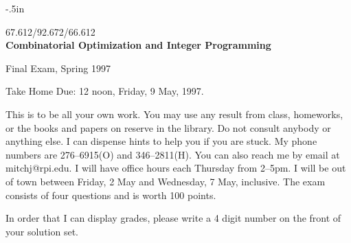 

\oddsidemargin -.5in
\textwidth 7in
\textheight 9.5in
\topmargin -30pt
\headsep 0in
\headheight 0in



\begin{center}
  \begin{large}
     67.612/92.672/66.612 \\
 {\bf Combinatorial Optimization and Integer Programming}
  \end{large}
\end{center}
\begin{center}
  \begin{large}
                Final Exam, Spring 1997
  \end{large}
\end{center}

Take Home   \hfill    Due: 12 noon, Friday, 9 May, 1997.

\vspace{\baselineskip}

This is to be all your own work.  You may use any result from class,
homeworks, or the books and papers on reserve in the library.
Do not consult anybody or anything else. 
I can dispense hints to help you if you are stuck.
My phone numbers are 276--6915(O) and 346--2811(H).
You can also reach me by email at mitchj@rpi.edu.
I will have office hours each Thursday from 2--5pm.
I will be out of town between Friday, 2 May and Wednesday, 7 May,
inclusive.
The exam consists of four questions and is worth 100 points.

In order that I can display grades, please write a 4 digit number
on the front of your solution set.

\vspace{\baselineskip}


